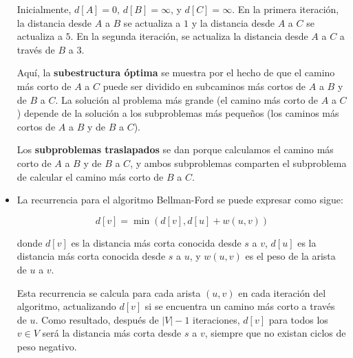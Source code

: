 \begin{problema}
\begin{sol}
\begin{itemize}
               
        
               Inicialmente, $d[A]=0$, $d[B]=\infty$, y $d[C]=\infty$. En la primera iteración, la distancia desde $A$ a $B$ se actualiza a $1$ y la distancia desde $A$ a $C$ se actualiza a $5$. En la segunda iteración, se actualiza la distancia desde $A$ a $C$ a través de $B$ a $3$.
            
               Aquí, la \textbf{subestructura óptima} se muestra por el hecho de que el camino más corto de $A$ a $C$ puede ser dividido en subcaminos más cortos de $A$ a $B$ y de $B$ a $C$. La solución al problema más grande (el camino más corto de $A$ a $C$) depende de la solución a los subproblemas más pequeños (los caminos más cortos de $A$ a $B$ y de $B$ a $C$).
            
               Los \textbf{subproblemas traslapados} se dan porque calculamos el camino más corto de $A$ a $B$ y de $B$ a $C$, y ambos subproblemas comparten el subproblema de calcular el camino más corto de $B$ a $C$.
            
                \item La recurrencia para el algoritmo Bellman-Ford se puede expresar como sigue:
            
               \[d[v] = \min(d[v], d[u] + w(u, v))\]
            
               donde $d[v]$ es la distancia más corta conocida desde $s$ a $v$, $d[u]$ es la distancia más corta conocida desde $s$ a $u$, y $w(u, v)$ es el peso de la arista de $u$ a $v$.
            
               Esta recurrencia se calcula para cada arista $(u, v)$ en cada iteración del algoritmo, actualizando $d[v]$ si se encuentra un camino más corto a través de $u$. Como resultado, después de $|V|-1$ iteraciones, $d[v]$ para todos los $v \in V$ será la distancia más corta desde $s$ a $v$, siempre que no existan ciclos de peso negativo.
            
        \end{itemize}

    \end{sol}
\end{problema}


%
%


